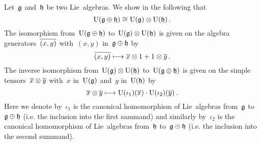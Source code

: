 \begin{example}
	\label{explicit isomorphism for uea of direct sum}
	Let~$\mathfrak{g}$ and~$\mathfrak{h}$ be two Lie~algebras.
	We show in the following that
	\[
		\Univ(\glie \oplus \hlie)
		\cong
		\Univ(\glie) \tensor \Univ(\hlie) \,.
		\index{universal eneveloping algebra!of the direct sum of Lie algebras}
	\]
	The isomorphism from~$\operatorname{U}(\mathfrak{g} \oplus \mathfrak{h})$ to~$\operatorname{U}(\mathfrak{g}) \otimes \operatorname{U}(\mathfrak{h})$ is given on the algebra generators~$\overline{(x,y)}$ with~$(x,y)$ in~$\mathfrak{g} \oplus \mathfrak{h}$ by
	\[
		\class{(x,y)}
		\mapsto
		\class{x} \tensor 1 + 1 \tensor \class{y} \,.
	\]
	The inverse isomorphism from~$\operatorname{U}(\mathfrak{g}) \otimes \operatorname{U}(\mathfrak{h})$ to~$\operatorname{U}(\mathfrak{g} \oplus \mathfrak{h})$ is given on the simple tensors~$\overline{x} \otimes \overline{y}$ with~$x$ in~$\operatorname{U}(\mathfrak{g})$ and~$y$ in~$\operatorname{U}(\mathfrak{h})$ by
	\[
		\class{x} \tensor \class{y}
		\mapsto
		\Univ( \iota_1 )( \class{x} )
		\cdot
		\Univ( \iota_2 )( \class{y} ) \,.
	\]
	Here we denote by~$\iota_1$ is the canonical homomorphism of Lie~algebras from~$\mathfrak{g}$ to~$\mathfrak{g} \oplus \mathfrak{h}$ (i.e. the inclusion into the first sammand) and similarly by~$\iota_2$ is the canonical homomorphism of Lie~algebras from~$\mathfrak{h}$ to~$\mathfrak{g} \oplus \mathfrak{h}$ (i.e. the inclusion into the second summand).


\end{example}

